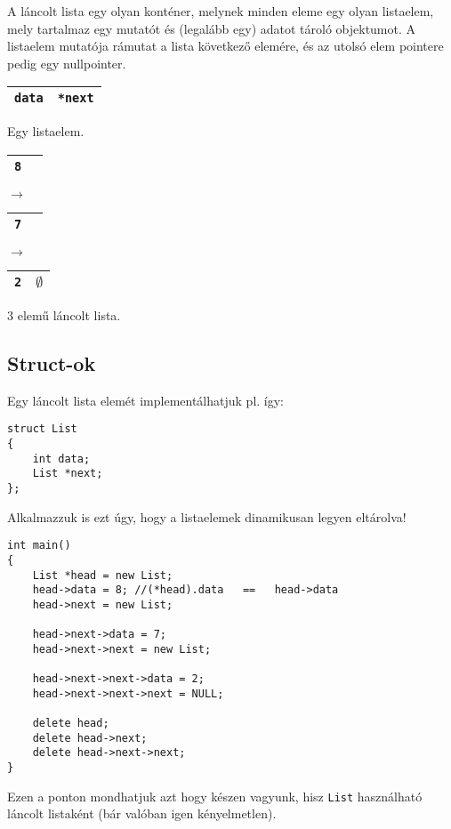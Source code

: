 \documentclass[a4paper,11.5pt]{article}
\begin{document}
	\smallskip
	A láncolt lista egy olyan konténer, melynek minden eleme egy olyan listaelem, mely tartalmaz egy mutatót és (legalább egy) adatot tároló objektumot. A listaelem mutatója rámutat a lista következő elemére, és az utolsó elem pointere pedig egy nullpointer.
	\begin{center}
		\begin{tabular}{|c|c|}
			\hline
			\texttt{data}&\texttt{*next}\\
			\hline
		\end{tabular}
		\smallskip
		
		Egy listaelem.
		\medskip
		
		\begin{tabular}{|c|c|}
			\hline
			\texttt{8}&\texttt{}\\
			\hline
		\end{tabular}$\rightarrow$
		\begin{tabular}{|c|c|}
			\hline
			\texttt{7}&\texttt{}\\
			\hline
		\end{tabular}$\rightarrow$
		\begin{tabular}{|c|c|}
			\hline
			\texttt{2}&\texttt{$\emptyset$}\\
			\hline
		\end{tabular}
		\smallskip
		
		3 elemű láncolt lista.
	\end{center}
	\subsection{Struct-ok}
	Egy láncolt lista elemét implementálhatjuk pl. így:
	\begin{lstlisting}
struct List
{
	int data;
	List *next;
};
	\end{lstlisting}
	Alkalmazzuk is ezt úgy, hogy  a listaelemek dinamikusan legyen eltárolva!
	\begin{lstlisting}
int main()
{
	List *head = new List;
	head->data = 8; //(*head).data   ==   head->data
	head->next = new List;
	
	head->next->data = 7;
	head->next->next = new List;
	
	head->next->next->data = 2;
	head->next->next->next = NULL;
	
	delete head;
	delete head->next;
	delete head->next->next;
}
	\end{lstlisting}
	Ezen a ponton mondhatjuk azt hogy készen vagyunk, hisz \texttt{List} használható láncolt listaként (bár valóban igen kényelmetlen).
	\medskip
	
\end{document}

